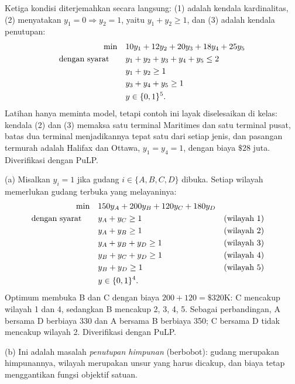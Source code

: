 
Ketiga kondisi diterjemahkan secara langsung: (1) adalah kendala kardinalitas, (2) menyatakan $y_1 = 0 \Rightarrow y_2 = 1$, yaitu $y_1 + y_2 \geq 1$, dan (3) adalah kendala penutupan:
\[
\begin{aligned}
\min\quad & 10y_1 + 12y_2 + 20y_3 + 18y_4 + 25y_5\\
\mbox{dengan syarat}\quad\quad & y_1 + y_2 + y_3 + y_4 + y_5 \leq 2\\
& y_1 + y_2 \geq 1\\
& y_3 + y_4 + y_5 \geq 1\\
& y \in \{0,1\}^5.
\end{aligned}
\]
Latihan hanya meminta model, tetapi contoh ini layak diselesaikan di kelas: kendala (2) dan (3) memaksa satu terminal Maritimes dan satu terminal pusat, batas dua terminal menjadikannya tepat satu dari setiap jenis, dan pasangan termurah adalah Halifax dan Ottawa, $y_1 = y_4 = 1$, dengan biaya $\$28$ juta. Diverifikasi dengan PuLP.


(a) Misalkan $y_i = 1$ jika gudang $i \in \{A, B, C, D\}$ dibuka. Setiap wilayah memerlukan gudang terbuka yang melayaninya:
\[
\begin{aligned}
\min\quad & 150y_A + 200y_B + 120y_C + 180y_D\\
\mbox{dengan syarat}\quad\quad & y_A + y_C \geq 1 && \mbox{(wilayah 1)}\\
& y_A + y_B \geq 1 && \mbox{(wilayah 2)}\\
& y_A + y_B + y_D \geq 1 && \mbox{(wilayah 3)}\\
& y_B + y_C + y_D \geq 1 && \mbox{(wilayah 4)}\\
& y_B + y_D \geq 1 && \mbox{(wilayah 5)}\\
& y \in \{0,1\}^4.
\end{aligned}
\]
Optimum membuka B dan C dengan biaya $200 + 120 = \$320$K: C mencakup wilayah 1 dan 4, sedangkan B mencakup 2, 3, 4, 5. Sebagai perbandingan, A bersama D berbiaya 330 dan A bersama B berbiaya 350; C bersama D tidak mencakup wilayah 2. Diverifikasi dengan PuLP.

(b) Ini adalah masalah \emph{penutupan himpunan} (berbobot): gudang merupakan himpunannya, wilayah merupakan unsur yang harus dicakup, dan biaya tetap menggantikan fungsi objektif satuan.


